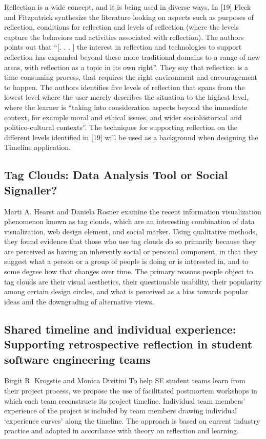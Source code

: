 Reflection is a wide concept, and it is being used in diverse ways. In [19]
Fleck and Fitzpatrick synthesize the literature looking on aspects such as
purposes of reflection, conditions for reflection and levels of reflection (where
the levels capture the behaviors and activities associated with reflection).
The authors points out that “[. . . ] the interest in reflection and technologies
to support reflection has expanded beyond these more traditional domains
to a range of new areas, with reflection as a topic in its own right”. They
say that reflection is a time consuming process, that requires the right environment
and encouragement to happen. The authors identifies five levels of
reflection that spans from the lowest level where the user merely describes the
situation to the highest level, where the learner is “taking into consideration
aspects beyond the immediate context, for example moral and ethical issues,
and wider sociohistorical and politico-cultural contexts”. The techniques for
supporting reflection on the different levels identified in [19] will be used as
a background when designing the Timeline application.

\subsection{Tag Clouds: Data Analysis Tool or Social Signaller?}\cite{Hearst2008}
Marti A. Hearst and Daniela Rosner examine the recent information visualization phenomenon known as tag clouds, which are an interesting combination of data visualization, web design element, and social marker. Using qualitative methods, they found evidence that those who use tag clouds do so primarily because they are perceived as having an inherently social or personal component, in that they suggest what a person or a group of people is doing or is interested in, and to some degree how that changes over time. The primary reasons people object to tag clouds are their visual aesthetics, their questionable usability, their popularity among certain design circles, and what is perceived as a bias towards popular ideas and the downgrading of alternative views.

\subsection{Shared timeline and individual experience: Supporting retrospective reflection in student software engineering teams}\cite{Krogstie2009}
Birgit R. Krogstie and Monica Divitini To help SE student teams learn from their project process, we propose the use of facilitated postmortem workshops in which each team reconstructs its project timeline. Individual team members’ experience of the project is included by team members drawing individual ‘experience curves’ along the timeline. The approach is based on current industry practice and adapted in accordance with theory on reflection and learning.

